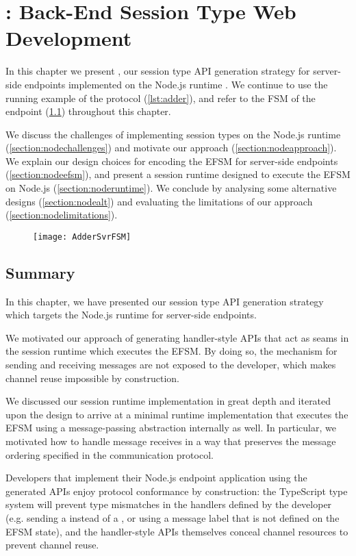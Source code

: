 \chapter{\nodecodegen: Back-End Session Type Web Development}
\label{chap:node}

In this chapter we present \nodecodegen,
our session type API generation strategy for 
server-side endpoints implemented on the Node.js runtime 
\cite{nodejs}.
We continue to use the running example of the 
protocol (\cref{lst:adder}),
and refer to the FSM of the  endpoint
(\cref{fig:addersvrfsm}) throughout this chapter.

We discuss the challenges of implementing
session types on the Node.js runtime 
(\cref{section:nodechallenges})
and motivate our approach (\cref{section:nodeapproach}).
We explain our design choices for encoding
the EFSM for server-side endpoints (\cref{section:nodeefsm}),
and present a session runtime designed
to execute the EFSM on Node.js (\cref{section:noderuntime}).
We conclude by analysing some alternative designs 
(\cref{section:nodealt}) and evaluating the limitations 
of our approach (\cref{section:nodelimitations}).

\begin{figure}[!b]
\centering
\texttt{[image: AdderSvrFSM]}
\label{fig:addersvrfsm}
\end{figure}








\section{Summary}
In this chapter, we have presented
our session type API generation strategy
which targets the Node.js runtime for server-side
endpoints.

We motivated our approach of generating
handler-style APIs that act as seams in the session runtime
which executes the EFSM.
By doing so, the mechanism for sending and receiving
messages are not exposed to the developer,
which makes channel reuse impossible by construction.

We discussed our session runtime implementation in great
depth and iterated upon the design to arrive at 
a minimal runtime implementation that executes the EFSM
using a message-passing abstraction internally as well.
In particular, we motivated how to handle message receives
in a way that preserves the message ordering specified
in the communication protocol.

Developers that implement their Node.js endpoint application
using the generated APIs enjoy protocol conformance
by construction: 
the TypeScript type system will prevent type mismatches
in the handlers defined by the developer
(e.g. sending a  instead of 
a , or using a message label
that is not defined on the EFSM state),
and the handler-style APIs themselves conceal channel
resources to prevent channel reuse.